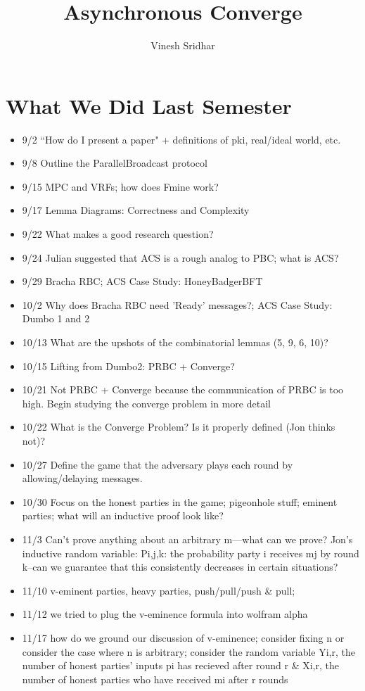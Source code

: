 \documentclass{article}
\title{Asynchronous Converge}
\author{Vinesh Sridhar}
\date{}
\begin{document}
\maketitle

\section{What We Did Last Semester}
\begin{itemize}
 \item 9/2 ``How do I present a paper" + definitions of pki, real/ideal world, etc.
 \item 9/8 Outline the ParallelBroadcast protocol
 \item 9/15 MPC and VRFs; how does Fmine work?
 \item 9/17 Lemma Diagrams: Correctness and Complexity
 \item 9/22 What makes a good research question?
 \item 9/24 Julian suggested that ACS is a rough analog to PBC; what is ACS?
 \item 9/29 Bracha RBC; ACS Case Study: HoneyBadgerBFT
 \item 10/2 Why does Bracha RBC need 'Ready' messages?; ACS Case Study: Dumbo 1 and 2
 \item 10/13 What are the upshots of the combinatorial lemmas (5, 9, 6, 10)?
 \item 10/15 Lifting from Dumbo2: PRBC + Converge?
 \item 10/21 Not PRBC + Converge because the communication of PRBC is too high. Begin studying the converge problem in more detail
 \item 10/22 What is the Converge Problem? Is it properly defined (Jon thinks not)?
 \item 10/27 Define the game that the adversary plays each round by allowing/delaying messages.
 \item 10/30 Focus on the honest parties in the game; pigeonhole stuff; eminent parties; what will an inductive proof look like?
 \item 11/3 Can't prove anything about an arbitrary m---what can we prove? Jon's inductive random variable: Pi,j,k: the probability party i receives mj by round k--can we guarantee that this consistently decreases in certain situations?
 \item 11/10 v-eminent parties, heavy parties, push/pull/push \& pull; 
 \item 11/12 we tried to plug the v-eminence formula into wolfram alpha
 \item 11/17 how do we ground our discussion of v-eminence; consider fixing n or consider the case where n is arbitrary; consider the random variable Yi,r, the number of honest parties' inputs pi has recieved after round r \& Xi,r, the number of honest parties who have received mi after r rounds

\end{itemize}
\end{document}
